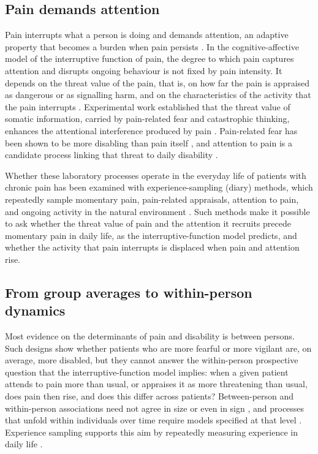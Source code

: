 \documentclass[11pt,a4paper]{article}
\begin{document}
\subsection{Pain demands attention}
Pain interrupts what a person is doing and demands attention, an adaptive property that becomes
a burden when pain persists \citep{eccleston1999pain}. In the cognitive-affective model of the
interruptive function of pain, the degree to which pain captures attention and disrupts ongoing
behaviour is not fixed by pain intensity. It depends on the threat value of the pain, that is,
on how far the pain is appraised as dangerous or as signalling harm, and on the characteristics
of the activity that the pain interrupts \citep{eccleston1999pain,eccleston2007worry}.
Experimental work established that the threat value of somatic information, carried by
pain-related fear and catastrophic thinking, enhances the attentional interference produced by
pain \citep{crombez1998catastrophizing,crombez1999fear,crombez2013attention}. Pain-related fear
has been shown to be more disabling than pain itself \citep{crombez1999fear}, and attention to
pain is a candidate process linking that threat to daily disability
\citep{vandamme2010keeping}.

Whether these laboratory processes operate in the everyday life of patients with chronic pain has
been examined with experience-sampling (diary) methods, which repeatedly sample momentary pain,
pain-related appraisals, attention to pain, and ongoing activity in the natural environment
\citep{tennen1996daily,affleck1999multilevel,peters2000electronic}. Such methods make it possible to ask whether the
threat value of pain and the attention it recruits precede momentary pain in daily life, as the
interruptive-function model predicts, and whether the activity that pain interrupts is displaced
when pain and attention rise.

\subsection{From group averages to within-person dynamics}
Most evidence on the determinants of pain and disability is between persons. Such designs show
whether patients who are more fearful or more vigilant are, on average, more disabled, but they
cannot answer the within-person prospective question that the interruptive-function model
implies: when a given patient attends to pain more than usual, or appraises it as more
threatening than usual, does pain then rise, and does this differ across patients? Between-person
and within-person associations need not agree in size or even in sign
\citep{curran2011disaggregation,fisher2018lack}, and processes that unfold within individuals
over time require models specified at that level
\citep{molenaar2004manifesto,hamaker2017no,wright2020personalized}. Experience sampling supports
this aim by repeatedly measuring experience in daily life
\citep{myingermeys2018experience,shiffman2008ecological,stone1998strategies}.
\end{document}

